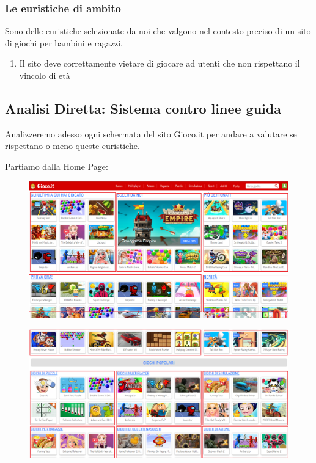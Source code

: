 \documentclass[../Report.tex]{subfiles}
\begin{document}
    \subsubsection{Le euristiche di ambito}
    Sono delle euristiche selezionate da noi che valgono nel contesto preciso di un sito di giochi per bambini e ragazzi.
    \begin{enumerate}
        \item Il sito deve correttamente vietare di giocare ad utenti che non rispettano il vincolo di età
    \end{enumerate}
    \subsection{Analisi Diretta: Sistema contro linee guida}
    Analizzeremo adesso ogni schermata del sito Gioco.it per andare a valutare se rispettano o meno queste euristiche.

    Partiamo dalla Home Page:
    \begin{figure}[H]
        \includegraphics[width=\linewidth]{Assestment1.png}
        \centering
    \end{figure}
    \begin{figure}[H]
        \includegraphics[width=\linewidth]{Assestment2.png}
        \centering
    \end{figure}
\end{document}
